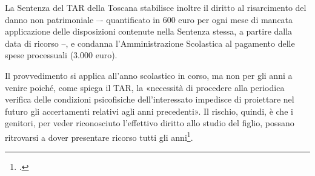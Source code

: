 La Sentenza del TAR della Toscana stabilisce inoltre il diritto al risarcimento del danno non patrimoniale –- quantificato in 600 euro per ogni mese di mancata applicazione delle disposizioni contenute nella Sentenza stessa, a partire dalla data di ricorso --, e condanna l'Amministrazione Scolastica al pagamento delle spese processuali (3.000 euro).

Il provvedimento si applica all'anno scolastico in corso, ma non per gli anni a venire poiché, come spiega il TAR, la «necessità di procedere alla periodica verifica delle condizioni psicofisiche dell'interessato impedisce di proiettare nel futuro gli accertamenti relativi agli anni precedenti». Il rischio, quindi, è che i genitori, per veder riconosciuto l'effettivo diritto allo studio del figlio, possano ritrovarsi a dover presentare ricorso tutti gli anni\footcite{Lancioni2014}. 
